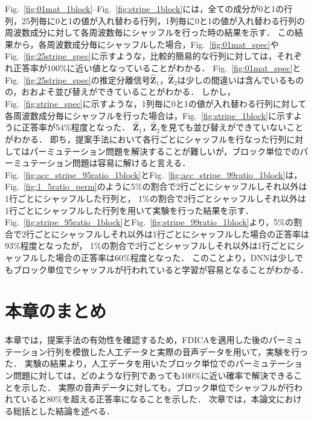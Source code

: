 Fig.~\ref{fig:01mat_1block}--Fig.~\ref{fig:stripe_1block}には，全ての成分が0と1の行列，25列毎に0と1の値が入れ替わる行列，1列毎に0と1の値が入れ替わる行列の周波数成分に対して各周波数毎にシャッフルを行った時の結果を示す．
この結果から，各周波数成分毎にシャッフルした場合，Fig.~\ref{fig:01mat_spec}やFig.~\ref{fig:25stripe_spec}に示すような，比較的簡易的な行列に対しては，それぞれ正答率が100\%に近い値となっていることがわかる．
Fig.~\ref{fig:01mat_spec}とFig.~\ref{fig:25stripe_spec}の推定分離信号$\hat{\bm{Z}}_1$，$\hat{\bm{Z}}_2$は少しの間違いは含んでいるものの，おおよそ並び替えができていることがわかる．
しかし，Fig.~\ref{fig:stripe_spec}に示すような，1列毎に0と1の値が入れ替わる行列に対して各周波数成分毎にシャッフルを行った場合は，Fig.~\ref{fig:stripe_1block}に示すように正答率が54\%程度となった．
$\hat{\bm{Z}}_1$，$\hat{\bm{Z}}_2$を見ても並び替えができていないことがわかる．
即ち，提案手法において各行ごとにシャッフルを行なった行列に対してはパーミュテーション問題を解決することが難しいが，ブロック単位でのパーミュテーション問題は容易に解けると言える．
Fig.~\ref{fig:acc_stripe_95ratio_1block}とFig.~\ref{fig:acc_stripe_99ratio_1block}は，Fig.~\ref{fig:1_5ratio_perm}のように5\%の割合で2行ごとにシャッフルしそれ以外は1行ごとにシャッフルした行列と，
1\%の割合で2行ごとシャッフルしそれ以外は1行ごとにシャッフルした行列を用いて実験を行った結果を示す．
Fig.~\ref{fig:stripe_95ratio_1block}とFig.~\ref{fig:stripe_99ratio_1block}より，5\%の割合で2行ごとにシャッフルしそれ以外は1行ごとにシャッフルした場合の正答率は93\%程度となったが，
1\%の割合で2行ごとシャッフルしそれ以外は1行ごとにシャッフルした場合の正答率は60\%程度となった．
このことより，DNNは少しでもブロック単位でシャッフルが行われていると学習が容易となることがわかる．

\clearpage




\clearpage
\section{本章のまとめ}
\label{sec:matome}
本章では，提案手法の有効性を確認するため，FDICAを適用した後のパーミュテーション行列を模倣した人工データと実際の音声データを用いて，実験を行った．
実験の結果より，人工データを用いたブロック単位でのパーミュテーション問題に対しては，どのような行列であっても100\%に近い確率で解決できることを示した．
実際の音声データに対しても，ブロック単位でシャッフルが行われていると80\%を超える正答率になることを示した．
次章では，本論文における総括とした結論を述べる．
